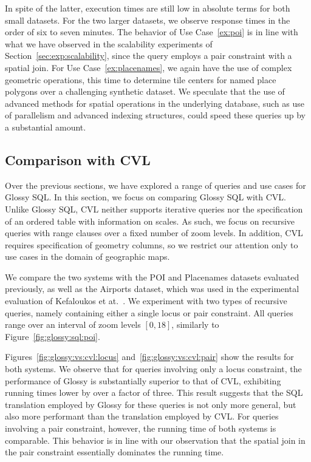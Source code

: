 \documentclass[11pt, oneside]{report}
\begin{document}
{In spite of the latter, execution times are still low in absolute terms for both small datasets. For the two larger datasets, we observe response times in the order of six to seven minutes. The behavior of Use Case~\ref{ex:poi} is in line with what we have observed in the scalability experiments of Section~\ref{sec:exp:scalability}, since the query employs a pair constraint with a spatial join. For Use Case~\ref{ex:placenames}, we again have the use of complex geometric operations, this time to determine tile centers for named place polygons over a challenging synthetic dataset. We speculate that the use of advanced methods for spatial operations in the underlying database, such as use of parallelism and advanced indexing structures, could speed these queries up by a substantial amount. 

\subsection{Comparison with CVL}

Over the previous sections, we have explored a range of queries and use cases for Glossy SQL. In this section, we focus on comparing Glossy SQL with CVL. Unlike Glossy SQL, CVL neither supports iterative queries nor the specification of an ordered table with information on scales. As such, we focus on recursive queries with range clauses over a fixed number of zoom levels. In addition, CVL requires specification of geometry columns, so we restrict our attention only to use cases in the domain of geographic maps. 

We compare the two systems with the POI and Placenames datasets evaluated previously, as well as the Airports dataset, which was used in the experimental evaluation of Kefaloukos et at.~\cite{kefaloukos2014declarative}. We experiment with two types of recursive queries, namely containing either a single locus or pair constraint. All queries range over an interval of zoom levels $[0,18]$, similarly to Figure~\ref{fig:glossy:sql:poi}. 

Figures~\ref{fig:glossy:vs:cvl:locus} and~\ref{fig:glossy:vs:cvl:pair} show the results for both systems. We observe that for queries involving only a locus constraint, the performance of Glossy is substantially superior to that of CVL, exhibiting running times lower by over a factor of three. This result suggests that the SQL translation employed by Glossy for these queries is not only more general, but also more performant than the translation employed by CVL. For queries involving a pair constraint, however, the running time of both systems is comparable. This behavior is in line with our observation that the spatial join in the pair constraint essentially dominates the running time.        

}
\end{document}

